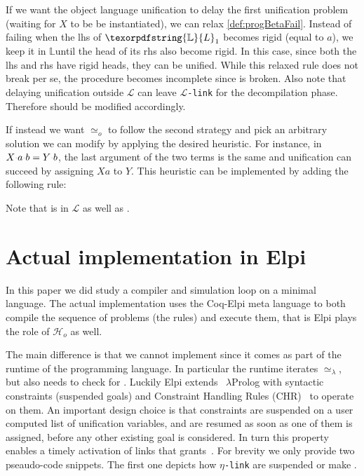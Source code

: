 \documentclass[sigconf,natbib=false,review]{acmart}
\newcommand{\appsep}{\ensuremath{\textcolor{lightgray}{\cdot}}}
\newcommand{\UnifRel}{\ensuremath{\simeq}}
\newcommand{\Uo}{\texorpdfstring{\ensuremath{\UnifRel_o}\xspace}{unif\_o}}
\newcommand{\Ue}{\ensuremath{\UnifRel_\lambda}\xspace}
\newcommand{\llambda}{\ensuremath{\mathcal{L}}\xspace}
\newcommand{\linkMacro}[1]{\ensuremath{#1}\texttt{-link}\xspace}
\newcommand{\linkbeta}{\linkMacro{\llambda}}
\newcommand{\linketa} {\linkMacro{\eta}}
\newcommand{\Ho}{\texorpdfstring{\ensuremath{\mathcal{H}_o}\xspace}{Ho}}
\newcommand{\lhs}{lhs\xspace}
\newcommand{\rhs}{rhs\xspace}
\newcommand{\linkStore}{\texorpdfstring{\ensuremath{\mathbb{L}}\xspace}{L}}
\begin{document}
\noindent
If we want the object language unification to delay the first unification problem
(waiting for $X$ to be be instantiated),
we can relax \cref{def:progBetaFail}. 
Instead of failing when the \lhs of $\linkStore_1$ becomes rigid (equal to $a$),
we keep it in \linkStore until the head of its \rhs also become rigid.
In this case, since both the \lhs and \rhs have rigid heads, they can be unified.
While this relaxed rule does not break  per se,
the  procedure becomes incomplete since
 is broken. Also note that delaying unification outside \llambda can leave \linkbeta for the
decompilation phase. Therefore  should
be modified accordingly.


If instead we want \Uo{} to follow the second strategy and pick an
arbitrary solution we can modify \progress by applying the desired heuristic.
For instance, in $X \appsep a \appsep b = Y \appsep b$, the last
argument of the two terms is the same and unification can succeed by assigning
$X a$ to $Y$. This heuristic can be implemented by adding the following rule:



\noindent
Note that  is in \llambda as well as . 

\section{Actual implementation in Elpi}\label{sec:implementation}

In this paper we did study a compiler and simulation loop on a minimal language.
The actual implementation uses the Coq-Elpi meta language to both compile
the sequence of problems (the rules) and execute them, that is Elpi
plays the role of \Ho{} as well.

The main difference is that we cannot implement \hrun since it comes as part of
the runtime of the programming language. In particular the runtime iterates
\Ue, but \hstep also needs to check for \progress. Luckily Elpi extends~\cite{TASSI_2019}
$\lambda$Prolog with syntactic constraints (suspended goals) and
Constraint Handling Rules (CHR)~\cite{fruehwirth2017constraint} to operate on them.
An important design choice is that constraints are suspended on a user
computed list of unification variables, and are resumed as soon as one of them
is assigned, before any other existing goal is considered. In turn this
property enables a timely activation of links that grants~.
For brevity we only provide two pseaudo-code snippets. The first one depicts
how \linketa are suspended or make \progress.
\end{document}
